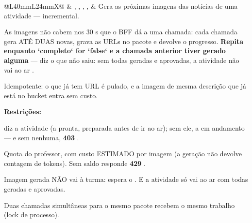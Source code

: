 \begin{tabularx}{\linewidth}{@{}L{40mm}L{24mm}X@{}}
 & , , , ,  & Gera as próximas imagens das notícias de uma atividade --- incremental.\par As imagens não cabem nos 30 s que o BFF dá a uma chamada: cada chamada gera ATÉ DUAS novas, grava as URLs no pacote e devolve o progresso. \textbf{Repita enquanto `completo` for `false` e a chamada anterior tiver gerado alguma} ---  diz o que não saiu: sem todas geradas e aprovadas, a atividade não vai ao ar .\par Idempotente: o que já tem URL é pulado, e a imagem de mesma descrição que já está no bucket entra sem custo.\par \textbf{Restrições:}\par \hspace*{1em}\textbullet{}  diz a atividade (a pronta, preparada antes de ir ao ar); sem ele, a em andamento --- e sem nenhuma, \textbf{403} .\par \hspace*{1em}\textbullet{} Quota do professor, com custo ESTIMADO por imagem (a geração não devolve contagem de tokens). Sem saldo responde \textbf{429} .\par \hspace*{1em}\textbullet{} Imagem gerada NÃO vai à turma: espera o  . E a atividade só vai ao ar com todas geradas e aprovadas.\par \hspace*{1em}\textbullet{} Duas chamadas simultâneas para o mesmo pacote recebem o mesmo trabalho (lock de processo).\\

\end{tabularx}
